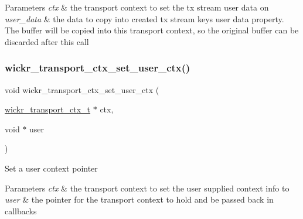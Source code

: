 \begin{DoxyParams}{Parameters}
{\em ctx} & the transport context to set the tx stream user data on \\
\hline
{\em user\+\_\+data} & the data to copy into created tx stream keys user data property. The buffer will be copied into this transport context, so the original buffer can be discarded after this call \\
\hline
\end{DoxyParams}
\mbox{\label{group__wickr__transport__ctx_gac1865750950d6ff5ba3850c5f03ab3c9}} 
\subsubsection{\texorpdfstring{wickr\+\_\+transport\+\_\+ctx\+\_\+set\+\_\+user\+\_\+ctx()}{wickr\_transport\_ctx\_set\_user\_ctx()}}
{\footnotesize\ttfamily void wickr\+\_\+transport\+\_\+ctx\+\_\+set\+\_\+user\+\_\+ctx (\begin{DoxyParamCaption}\item[{\hyperlink{structwickr__transport__ctx}{wickr\+\_\+transport\+\_\+ctx\+\_\+t} $\ast$}]{ctx,  }\item[{void $\ast$}]{user }\end{DoxyParamCaption})}

Set a user context pointer


\begin{DoxyParams}{Parameters}
{\em ctx} & the transport context to set the user supplied context info to \\
\hline
{\em user} & the pointer for the transport context to hold and be passed back in callbacks \\
\hline
\end{DoxyParams}
\mbox{\label{group__wickr__transport__ctx_gaee74761e31d5f0a6fc97e2ccf5ac1e29}} 
